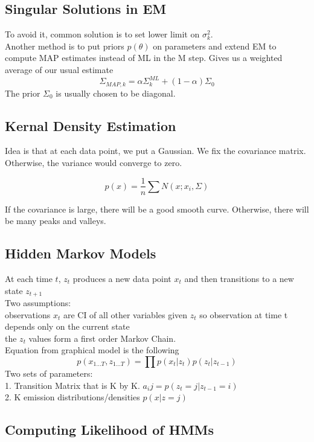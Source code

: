 \documentclass[11pt,psfig]{article}
\begin{document}
\subsection*{Singular Solutions in EM}

To avoid it, common solution is to set lower limit on $\sigma_k^2$.\\
Another method is to put priors $p(\theta)$ on parameters and extend EM to compute MAP estimates instead of ML in the M step. Gives us a weighted average of our usual estimate
\[
\Sigma_{MAP,k} = \alpha \Sigma_k^{ML} + (1-\alpha)\Sigma_0
\]
The prior $\Sigma_0$ is usually chosen to be diagonal. 

\subsection*{Kernal Density Estimation}

Idea is that at each data point, we put a Gaussian. We fix the covariance matrix. Otherwise, the variance would converge to zero. 

\[
p(x) = \frac{1}{n} \sum{N(x;x_i,\Sigma)}
\]

If the covariance is large, there will be a good smooth curve. Otherwise, there will be many peaks and valleys. 

\subsection*{Hidden Markov Models}

At each time $t$, $z_t$ produces a new data point $x_t$ and then transitions to a new state $z_{t+1}$\\
Two assumptions:
\\
observations $x_t$ are CI of all other variables given $z_t$ so observation at time t depends only on the current state
\\
the $z_t$ values form a first order Markov Chain.\\
Equation from graphical model is the following
\[
p(x_{1...T},z_{1...T}) = \prod p(x_t|z_t)p(z_t|z_{t-1})
\]
Two sets of parameters:
\\
1. Transition Matrix that is K by K. $a_ij = p(z_t=j|z_{t-1}=i)$
\\
2. K emission distributions/densities $p(x|z=j)$
\\

\subsection*{Computing Likelihood of HMMs}
\end{document}
